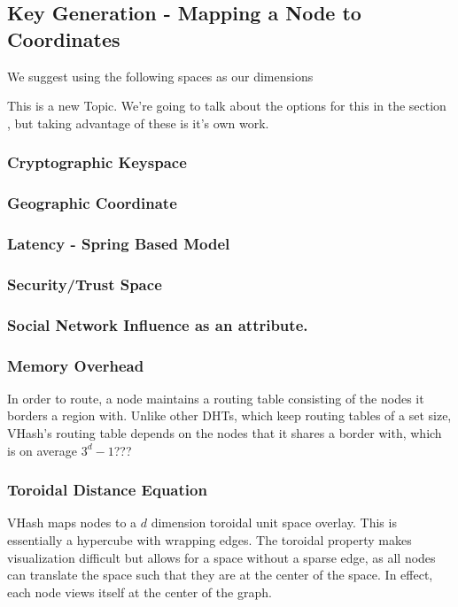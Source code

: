 \documentclass{IEEEtran}
\begin{document}
\subsection{Key Generation - Mapping a Node to Coordinates}

We suggest using the following spaces as our dimensions

This is a new Topic.  We're going to talk about the options for this in the section , but taking advantage of these is it's own work.

\subsubsection{Cryptographic Keyspace}


\subsubsection{Geographic Coordinate}

\subsubsection{Latency - Spring Based Model}

\subsubsection{Security/Trust Space}

\subsubsection{Social Network Influence as an attribute.}





\subsubsection{Memory Overhead}
In order to route, a node maintains a routing table consisting of the nodes it borders a region with.  Unlike other DHTs, which keep routing tables of a set size, VHash's routing table depends on the nodes that it shares a border with, which is on average $3^d -1$???


 
\subsubsection{Toroidal Distance Equation}
VHash maps nodes to a $d$ dimension toroidal unit space overlay. This is essentially a hypercube with wrapping edges. The toroidal property makes visualization difficult but allows for a space without a sparse edge, as all nodes can translate the space such that they are at the center of the space.  In effect, each node views itself at the center of the graph.
\end{document}
